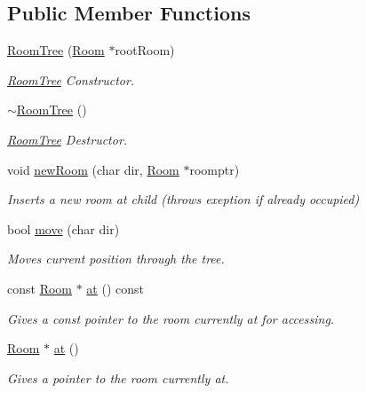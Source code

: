 \subsection*{Public Member Functions}
\begin{DoxyCompactItemize}
\item 
\hyperlink{classRoomTree_a2ea4adb06c7a1913d21ebaa6548a0167}{Room\-Tree} (\hyperlink{classRoom}{Room} $\ast$root\-Room)
\begin{DoxyCompactList}\small\item\em \hyperlink{classRoomTree}{Room\-Tree} Constructor. \end{DoxyCompactList}\item 
\hyperlink{classRoomTree_a1bd0bf9ba15d59e29127f762a3cdf036}{$\sim$\-Room\-Tree} ()
\begin{DoxyCompactList}\small\item\em \hyperlink{classRoomTree}{Room\-Tree} Destructor. \end{DoxyCompactList}\item 
void \hyperlink{classRoomTree_a198fd76507d341091eff6f9cb367d551}{new\-Room} (char dir, \hyperlink{classRoom}{Room} $\ast$roomptr)
\begin{DoxyCompactList}\small\item\em Inserts a new room at child (throws exeption if already occupied) \end{DoxyCompactList}\item 
bool \hyperlink{classRoomTree_af3d5ff5c2c7722186283c69c9519cd14}{move} (char dir)
\begin{DoxyCompactList}\small\item\em Moves current position through the tree. \end{DoxyCompactList}\item 
const \hyperlink{classRoom}{Room} $\ast$ \hyperlink{classRoomTree_a077743215ed41e741fd4106b3d285693}{at} () const 
\begin{DoxyCompactList}\small\item\em Gives a const pointer to the room currently at for accessing. \end{DoxyCompactList}\item 
\hyperlink{classRoom}{Room} $\ast$ \hyperlink{classRoomTree_abfad141f868410fa8c578d19f45eaa05}{at} ()
\begin{DoxyCompactList}\small\item\em Gives a pointer to the room currently at. \end{DoxyCompactList}\end{DoxyCompactItemize}
